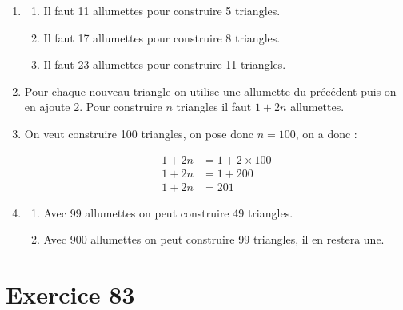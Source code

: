 \documentclass[12pt,a4paper]{article}
\begin{document}
	\begin{enumerate}[label=\arabic*)]
		\item \begin{enumerate} [label=\alph*)]
			\item Il faut 11 allumettes pour construire 5 triangles.
			\item Il faut 17 allumettes pour construire 8 triangles.
			\item Il faut 23 allumettes pour construire 11 triangles.
			
		\end{enumerate}
	
		\item Pour chaque nouveau triangle on utilise une allumette du précédent puis on en ajoute 2. Pour construire $n$ triangles il faut $1 + 2n$ allumettes.
		
		\item On veut construire 100 triangles, on pose donc $n=100$, on a donc :
		
		\begin{align*}
			1 + 2n &= 1 + 2 \times 100 \\
			1 + 2n &= 1 + 200 \\
			1 + 2n &= 201 			
		\end{align*}
		
		\item \begin{enumerate}[label=\alph*)]
			\item Avec 99 allumettes on peut construire 49 triangles.
			\item Avec 900 allumettes on peut construire 99 triangles, il en restera une.
		\end{enumerate}
	\end{enumerate}

\section*{Exercice 83}
	
\end{document}

